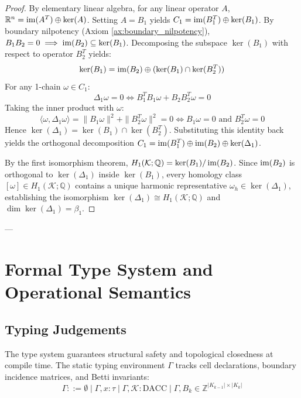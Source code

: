 \begin{proof}
By elementary linear algebra, for any linear operator $A$, $\mathbb{R}^n = \operatorname{im}(A^T) \oplus \ker(A)$. Setting $A = B_1$ yields $C_1 = \operatorname{im}(B_1^T) \oplus \ker(B_1)$. By boundary nilpotency (Axiom \ref{ax:boundary_nilpotency}), $B_1 B_2 = 0 \implies \operatorname{im}(B_2) \subseteq \ker(B_1)$. Decomposing the subspace $\ker(B_1)$ with respect to operator $B_2^T$ yields:
\begin{equation}
    \ker(B_1) = \operatorname{im}(B_2) \oplus (\ker(B_1) \cap \ker(B_2^T))
\end{equation}
For any 1-chain $\omega \in C_1$:
\begin{equation}
    \Delta_1 \omega = 0 \iff B_1^T B_1 \omega + B_2 B_2^T \omega = 0
\end{equation}
Taking the inner product with $\omega$:
\begin{equation}
    \langle \omega, \Delta_1 \omega \rangle = \| B_1 \omega \|^2 + \| B_2^T \omega \|^2 = 0 \iff B_1 \omega = 0 \text{ and } B_2^T \omega = 0
\end{equation}
Hence $\ker(\Delta_1) = \ker(B_1) \cap \ker(B_2^T)$. Substituting this identity back yields the orthogonal decomposition $C_1 = \operatorname{im}(B_1^T) \oplus \operatorname{im}(B_2) \oplus \ker(\Delta_1)$. 

By the first isomorphism theorem, $H_1(\mathcal{K}; \mathbb{Q}) = \ker(B_1) / \operatorname{im}(B_2)$. Since $\operatorname{im}(B_2)$ is orthogonal to $\ker(\Delta_1)$ inside $\ker(B_1)$, every homology class $[\omega] \in H_1(\mathcal{K}; \mathbb{Q})$ contains a unique harmonic representative $\omega_h \in \ker(\Delta_1)$, establishing the isomorphism $\ker(\Delta_1) \cong H_1(\mathcal{K}; \mathbb{Q})$ and $\dim \ker(\Delta_1) = \beta_1$.
\end{proof}

---

\section{Formal Type System and Operational Semantics}
\label{sec:formal_type_system}

\subsection{Typing Judgements}
The \ToposLang{} type system guarantees structural safety and topological closedness at compile time. The static typing environment $\Gamma$ tracks cell declarations, boundary incidence matrices, and Betti invariants:
\begin{equation}
    \Gamma ::= \emptyset \mid \Gamma, x : \tau \mid \Gamma, \mathcal{K} : \text{DACC} \mid \Gamma, B_k \in \mathbb{Z}^{|K_{k-1}| \times |K_k|}
\end{equation}


